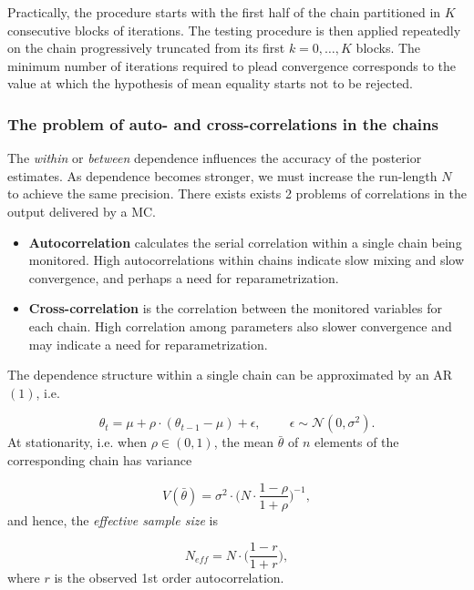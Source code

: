 Practically, the procedure starts with the first half of the chain partitioned in $K$ consecutive blocks of iterations. The testing procedure is then applied repeatedly on the chain progressively truncated from its first $k= 0,\ldots,K$ blocks. The minimum number of iterations required to plead convergence corresponds to the value at which the hypothesis of mean equality starts not to be rejected.





\subsubsection*{The problem of auto- and cross-correlations in the chains}

The \emph{within} or \emph{between} dependence influences the accuracy of the posterior estimates. As dependence becomes stronger, we must increase the run-length $N$ to achieve the same precision. 
There exists exists 2 problems of correlations in the output delivered by a MC. 

\begin{itemize}
	\item \textbf{Autocorrelation} calculates the serial correlation within a single chain being monitored. High autocorrelations within chains indicate slow mixing and slow convergence, and perhaps a need for reparametrization.
	
	\item \textbf{Cross-correlation} is the correlation between the monitored variables for each chain. High correlation among parameters also slower convergence and may indicate a need for reparametrization. 
\end{itemize}
The dependence structure within a single chain can be approximated by an AR$(1)$, i.e. 

\begin{equation*}
\theta_t=\mu + \rho\cdot (\theta_{t-1}-\mu)+\epsilon, \qquad \ \epsilon\sim \mathcal{N}(0,\sigma^2).
\end{equation*}
At stationarity, i.e. when $\rho\in(0,1)$, the mean $\bar{\theta}$ of $n$ elements of the corresponding chain has variance

\begin{equation*} V(\bar{\theta})=\sigma^2\cdot \bigg(N\cdot \frac{1-\rho}{1+\rho}\bigg)^{-1},
\end{equation*}
and hence, the \emph{effective sample size} is 

\begin{equation}\label{eq:neff}
N_{eff} = N\cdot \bigg( \frac{1-r}{1+r}\bigg),
\end{equation}
where $r$ is the observed 1st order autocorrelation.

